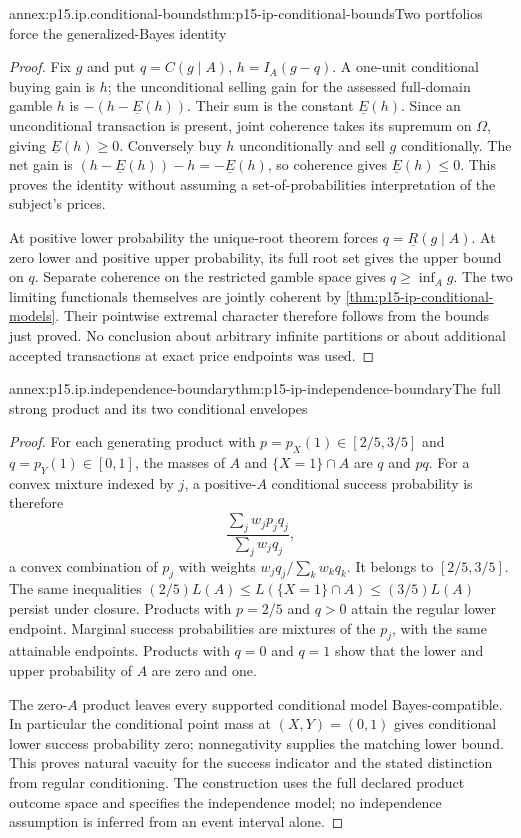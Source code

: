 \begin{annexitem}{annex:p15.ip.conditional-bounds}{thm:p15-ip-conditional-bounds}{Two portfolios force the generalized-Bayes identity}
\begin{proof}
Fix \(g\) and put \(q=C(g\mid A)\), \(h=I_A(g-q)\).
A one-unit conditional buying gain is \(h\); the unconditional
selling gain for the assessed full-domain gamble \(h\) is
\(-(h-\underline E(h))\). Their sum is the constant
\(\underline E(h)\). Since an unconditional transaction is present,
joint coherence takes its supremum on \(\Omega\), giving
\(\underline E(h)\geq0\). Conversely buy \(h\) unconditionally
and sell \(g\) conditionally. The net gain is
\((h-\underline E(h))-h=-\underline E(h)\), so coherence gives
\(\underline E(h)\leq0\). This proves the identity without
assuming a set-of-probabilities interpretation of the subject's prices.

At positive lower probability the unique-root theorem forces
\(q=\underline R(g\mid A)\). At zero lower and positive upper
probability, its full root set gives the upper bound on \(q\).
Separate coherence on the restricted gamble space gives
\(q\geq\inf_A g\). The two limiting functionals themselves are
jointly coherent by \cref{thm:p15-ip-conditional-models}. Their
pointwise extremal character therefore follows from the bounds just
proved. No conclusion about arbitrary infinite partitions or about
additional accepted transactions at exact price endpoints was used.
\end{proof}
\end{annexitem}

\begin{annexitem}{annex:p15.ip.independence-boundary}{thm:p15-ip-independence-boundary}{The full strong product and its two conditional envelopes}
\begin{proof}
For each generating product with \(p=p_X(1)\in[2/5,3/5]\)
and \(q=p_Y(1)\in[0,1]\), the masses of \(A\) and
\(\{X=1\}\cap A\) are \(q\) and \(pq\).
For a convex mixture indexed by \(j\), a positive-\(A\) conditional
success probability is therefore
\[
           \frac{\sum_j w_jp_jq_j}{\sum_j w_jq_j},
\]
a convex combination of \(p_j\) with weights
\(w_jq_j/\sum_k w_kq_k\). It belongs to \([2/5,3/5]\).
The same inequalities \((2/5)L(A)\leq L(\{X=1\}\cap A)
\leq(3/5)L(A)\) persist under closure. Products with \(p=2/5\)
and \(q>0\) attain the regular lower endpoint. Marginal success
probabilities are mixtures of the \(p_j\), with the same attainable
endpoints. Products with \(q=0\) and \(q=1\) show that the
lower and upper probability of \(A\) are zero and one.

The zero-\(A\) product leaves every supported conditional model
Bayes-compatible. In particular the conditional point mass at
\((X,Y)=(0,1)\) gives conditional lower success probability zero;
nonnegativity supplies the matching lower bound. This proves natural
vacuity for the success indicator and the stated distinction from
regular conditioning. The construction uses the full declared product
outcome space and specifies the independence model; no independence
assumption is inferred from an event interval alone.
\end{proof}
\end{annexitem}
